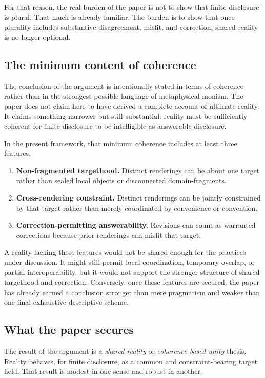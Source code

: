 \documentclass[11pt]{article}
\renewcommand{\emph}[1]{\textit{#1}}
\begin{document}
For that reason, the real burden of the paper is not to show that finite disclosure is plural. That much is already familiar. The burden is to show that once plurality includes substantive disagreement, misfit, and correction, shared reality is no longer optional.

\subsection{The minimum content of coherence}

The conclusion of the argument is intentionally stated in terms of coherence rather than in the strongest possible language of metaphysical monism. The paper does not claim here to have derived a complete account of ultimate reality. It claims something narrower but still substantial: reality must be sufficiently coherent for finite disclosure to be intelligible as answerable disclosure.

In the present framework, that minimum coherence includes at least three features.

\begin{enumerate}
    \item \textbf{Non-fragmented targethood.} Distinct renderings can be about one target rather than sealed local objects or disconnected domain-fragments.
    \item \textbf{Cross-rendering constraint.} Distinct renderings can be jointly constrained by that target rather than merely coordinated by convenience or convention.
    \item \textbf{Correction-permitting answerability.} Revisions can count as warranted corrections because prior renderings can misfit that target.
\end{enumerate}

A reality lacking these features would not be shared enough for the practices under discussion. It might still permit local coordination, temporary overlap, or partial interoperability, but it would not support the stronger structure of shared targethood and correction. Conversely, once these features are secured, the paper has already earned a conclusion stronger than mere pragmatism and weaker than one final exhaustive descriptive scheme.

\subsection{What the paper secures}

The result of the argument is a \emph{shared-reality} or \emph{coherence-based unity} thesis. Reality behaves, for finite disclosure, as a common and constraint-bearing target field. That result is modest in one sense and robust in another.
\end{document}
